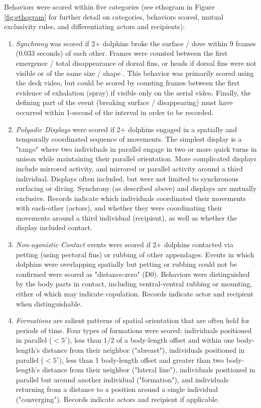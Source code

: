 \documentclass[11pt]{amsart}
\begin{document}
Behaviors were scored within five categories (see ethogram in Figure \ref{fig:ethogram} for further detail on categories, behaviors scored, mutual exclusivity rules, and differentiating actors and recipients):
\begin{enumerate}
\item{\emph{Synchrony}} was scored if 2+ dolphins broke the surface / dove within 9 frames (0.033 seconds) of each other. Frames were counted between the first emergence / total disappearance of dorsal fins, or heads if dorsal fins were not visible or of the same size / shape \citep{connor:2006}. This behavior was primarily scored using the deck video, but could be scored by counting frames between the first evidence of exhalation (spray) if visible only on the aerial video. Finally, the defining part of the event (breaking surface / disappearing) must have occurred within 1-second of the interval in order to be recorded. 
\item{\emph{Polyadic Displays}} were scored if 2+ dolphins engaged in a spatially and temporally coordinated sequence of movements. The simplest display is a "tango" where two individuals in parallel engage in two or more quick turns in unison while maintaining their parallel orientation. More complicated displays include mirrored activity, and mirrored or parallel activity around a third individual. Displays often included, but were not limited to synchronous surfacing or diving. Synchrony (as described above) and displays are mutually exclusive. Records indicate which individuals coordinated their movements with each-other (actors), and whether they were coordinating their movements around a third individual (recipient), as well as whether the display included contact.
\item{\emph{Non-agonistic Contact}} events were scored if 2+ dolphins contacted via petting (using pectoral fins) or rubbing of other appendages. Events in which dolphins were overlapping spatially but petting or rubbing could not be confirmed were scored as "distance-zero" (D0). Behaviors were distinguished by the body parts in contact, including ventral-ventral rubbing or mounting, either of which may indicate copulation. Records indicate actor and recipient when distinguishable.
\item{\emph{Formations}} are salient patterns of spatial orientation that are often held for periods of time. Four types of formations were scored: individuals positioned in parallel ($<5^{\circ}$), less than 1/2 of a body-length offset and within one body-length's distance from their neighbor ("abreast"), individuals positioned in parallel ($<5^{\circ}$), less than 1 body-length offset and greater than two body-length's distance from their neighbor ("lateral line"), individuals positioned in parallel but around another individual ("formation"), and individuals returning from a distance to a position around a single individual ("converging"). Records indicate actors and recipient if applicable.

\end{enumerate}
\end{document}
